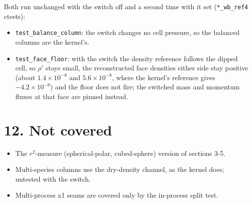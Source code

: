 \documentclass[11pt,a4paper]{article}
\begin{document}
Both run unchanged with the switch off and a second time with it set (\texttt{*\_wb\_ref4} ctests):

\begin{itemize}
\item \texttt{test\_balance\_column}: the switch changes no cell pressure, so the balanced columns are the kernel's.
\item \texttt{test\_face\_floor}: with the switch the density reference follows the dipped cell, so $\rho'$ stays small,
  the reconstructed face densities either side stay positive (about $1.4\times10^{-8}$ and $5.6\times10^{-8}$,
  where the kernel's reference gives $-4.2\times10^{-8}$) and the floor does not fire; the switched mass and
  momentum fluxes at that face are pinned instead.
\end{itemize}

\section*{12. Not covered}

\begin{itemize}
\item The $r^2$-measure (spherical-polar, cubed-sphere) version of sections 3-5.
\item Multi-species columns use the dry-density channel, as the kernel does; untested with the switch.
\item Multi-process x1 seams are covered only by the in-process split test.
\end{itemize}
\end{document}
